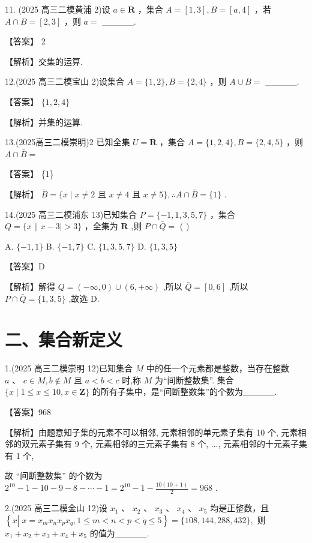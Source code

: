 \documentclass[10pt]{article}
\begin{document}
11. (2025 高三二模黄浦 2)设 \(a \in  \mathbf{R}\) ，集合 \(A = \left\lbrack  {1,3}\right\rbrack  ,B = \left\lbrack  {a,4}\right\rbrack\) ，若 \(A \cap  B = \left\lbrack  {2,3}\right\rbrack\) ，则 \(a =\) \_\_\_\_\_.

【答案】 2

【解析】交集的运算.

12.(2025 高三二模宝山 2)设集合 \(A = \{ 1,2\} ,B = \{ 2,4\}\) ，则 \(A \cup  B =\) \_\_\_\_\_.

【答案】 \(\{ 1,2,4\}\)

【解析】并集的运算.

13.(2025高三二模崇明)2 已知全集 \(U = \mathbf{R}\) ，集合 \(A = \{ 1,2,4\} ,B = \{ 2,4,5\}\) ，则 \(A \cap  \bar{B} =\)

【答案】 \{1\}

【解析】 \(\bar{B} = \{ x \mid  x \neq  2\) 且 \(x \neq  4\) 且 \(x \neq  5\} ,\therefore A \cap  \bar{B} = \{ 1\}\) .

14.(2025 高三二模浦东 13)已知集合 \(P = \{  - 1,1,3,5,7\}\) ，集合 \(Q = \{ x\parallel x - 3 \mid   > 3\}\) ，全集为 \(\mathbf{R}\) ,则 \(P \cap  \bar{Q} =\) (   )

A. \(\{  - 1,1\}\) B. \(\{  - 1,7\}\) C. \(\{ 1,3,5,7\}\) D. \(\{ 1,3,5\}\)

【答案】D

【解析】解得 \(Q = \left( {-\infty ,0}\right)  \cup  \left( {6, + \infty }\right)\) ,所以 \(\bar{Q} = \left\lbrack  {0,6}\right\rbrack\) ,所以 \(P \cap  \bar{Q} = \{ 1,3,5\}\) ,故选 D.

\section*{二、集合新定义}

1.(2025 高三二模崇明 12)已知集合 \(M\) 中的任一个元素都是整数，当存在整数 \(a\text{ 、 }c \in  M,b \notin  M\) 且 \(a < b < c\) 时,称 \(M\) 为“间断整数集”. 集合 \(\{ x \mid  1 \leq  x \leq  {10},x \in  \mathbf{Z}\}\) 的所有子集中，是“间断整数集”的个数为\_\_\_\_\_.

【答案】968

【解析】由题意知子集的元素不可以相邻, 元素相邻的单元素子集有 10 个, 元素相邻的双元素子集有 9 个, 元素相邻的三元素子集有 8 个, ..., 元素相邻的十元素子集有 1 个,

故 “间断整数集” 的个数为 \({2}^{10} - 1 - {10} - 9 - 8 - \cdots  - 1 = {2}^{10} - 1 - \frac{{10}\left( {{10} + 1}\right) }{2} = {968}\) .

2.(2025 高三二模金山 12)设 \({x}_{1}\text{ 、 }{x}_{2}\text{ 、 }{x}_{3}\text{ 、 }{x}_{4}\text{ 、 }{x}_{5}\) 均是正整数，且 \(\left\{  {x\left| {\;x = {x}_{m}{x}_{n}{x}_{p}{x}_{q}}\right. ,1 \leq  m < n < p < q \leq  5}\right\}   = \{ {108},{144},{288},{432}\} ,\) 则 \({x}_{1} + {x}_{2} + {x}_{3} + {x}_{4} + {x}_{5}\) 的值为\_\_\_\_\_.
\end{document}

